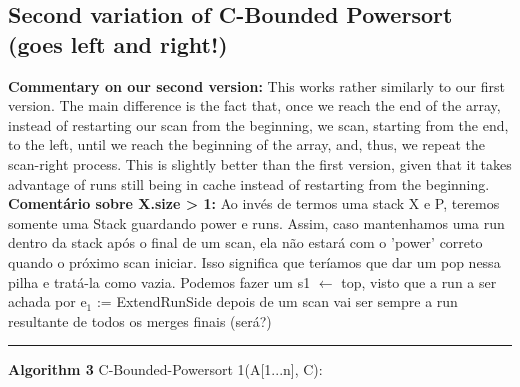 \documentclass{article}
\begin{document}
\subsection{\textbf{\textbf{Second variation of C-Bounded Powersort (goes left and right!)}}}
\textbf{Commentary on our second version:} This works rather similarly to our first version.
The main difference is the fact that, once we reach the end of the array, instead of restarting
our scan from the beginning, we scan, starting from the end, to the left, until we reach the beginning of the array,
and, thus, we repeat the scan-right process.
This is slightly better than the first version, given that it takes advantage of 
runs still being in cache instead of restarting from the beginning.
\textbf{Comentário sobre X.size > 1:} Ao invés de termos uma stack X e P, teremos somente uma Stack guardando power e runs. 
Assim, caso mantenhamos uma run dentro da stack após o final de um scan, ela não estará com o 'power' correto quando
o próximo scan iniciar. Isso significa que teríamos que dar um pop nessa pilha e tratá-la como vazia. Podemos fazer um s1 $\gets$ top,
visto que a run a ser achada por e$_1$ := ExtendRunSide depois de um scan vai ser sempre a run resultante de todos os merges finais (será?)

\noindent\rule{\linewidth}{0.8pt}\par %
\vspace{-0.3em} %
\noindent\textbf{Algorithm 3} C-Bounded-Powersort 1(A[1...n], C):\label{alg:powermy2temp}
\end{document}
